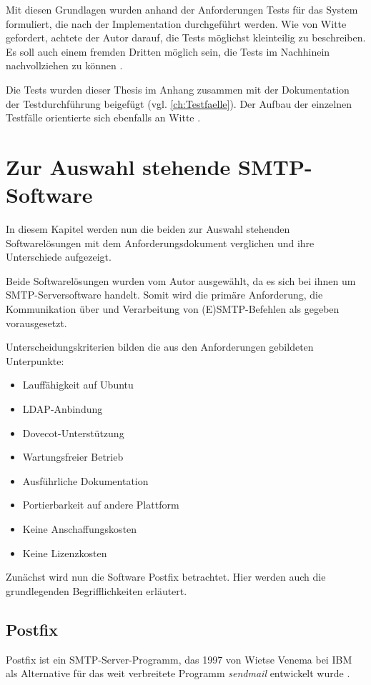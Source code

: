 Mit diesen Grundlagen wurden anhand der Anforderungen Tests für das System formuliert, die nach der Implementation durchgeführt werden. 
\citereset
Wie von Witte gefordert, achtete der Autor darauf, die Tests möglichst kleinteilig zu beschreiben. Es soll auch einem fremden Dritten möglich sein, die Tests im Nachhinein nachvollziehen zu können \citep[vgl.][S. 162 f.]{Witte2019}. 

Die Tests wurden dieser Thesis im Anhang zusammen mit der Dokumentation der Testdurchführung beigefügt (vgl. \autoref{ch:Testfaelle}). Der Aufbau der einzelnen Testfälle orientierte sich ebenfalls an Witte \citep[vgl.][162]{Witte2019}.


\chapter{Zur Auswahl stehende SMTP-Software}
\label{sec:Auswahl}
In diesem Kapitel werden nun die beiden zur Auswahl stehenden Softwarelösungen mit dem Anforderungsdokument verglichen und ihre Unterschiede aufgezeigt. 

Beide Softwarelösungen wurden vom Autor ausgewählt, da es sich bei ihnen um SMTP-Serversoftware handelt. Somit wird die primäre Anforderung, die Kommunikation über und Verarbeitung von (E)SMTP-Befehlen als gegeben vorausgesetzt.

Unterscheidungskriterien bilden die aus den Anforderungen gebildeten Unterpunkte:
\begin{itemize}
	\item Lauffähigkeit auf Ubuntu
	\item LDAP-Anbindung
	\item Dovecot-Unterstützung
	\item Wartungsfreier Betrieb
	\item Ausführliche Dokumentation
	\item Portierbarkeit auf andere Plattform
	\item Keine Anschaffungskosten
	\item Keine Lizenzkosten
\end{itemize}

Zunächst wird nun die Software Postfix betrachtet. Hier werden auch die grundlegenden Begrifflichkeiten erläutert.

\section{Postfix}
Postfix ist ein SMTP-Server-Programm, das 1997  von Wietse Venema bei IBM als Alternative für das weit verbreitete Programm \textit{sendmail} entwickelt wurde \citep[vgl.][307]{Deimeke2019}.

